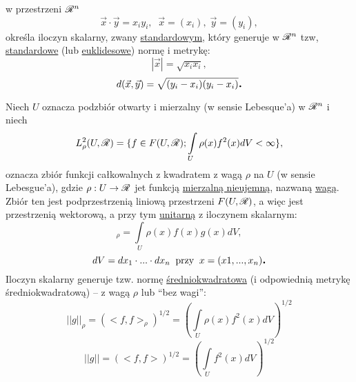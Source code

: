 \begin{example}
   w przestrzeni $\mathscr{R}^n$
   \[\vec{x} \cdot \vec{y} = x_i y_i, \;\; \vec{x} = (x_i), \; \vec{y} = (y_i),\]
   określa iloczyn skalarny, zwany \underline{standardowym}, który generuje w $\mathscr{R}^n$ tzw, \underline{standardowe} (lub \underline{euklidesowe}) normę i metrykę:
   \[|\vec{x}| = \sqrt{x_i x_i},\]
   \[d(\vec{x}, \vec{y}) = \sqrt{(y_i-x_i)(y_i-x_i)} \mbox{\large\bfseries .}\]
\end{example}

\begin{example}
   Niech $U$ oznacza podzbiór otwarty i mierzalny (w sensie Lebesque'a) w $\mathscr{R}^n$ i niech 
   \[L^2_\rho (U, \mathscr{R}) = \{f \in F(U, \mathscr{R}); \int \limits_{U} \rho(x) f^2(x) dV < \infty\},\]
   oznacza zbiór funkcji całkowalnych z kwadratem z wagą $\rho$ na $U$ (w sensie Lebesgue'a), gdzie $\rho: U \to \mathscr{R}$ jet funkcją \underline{mierzalną nieujemną}, nazwaną \underline{wagą}. Zbiór ten jest podprzestrzenią liniową przestrzeni $F(U, \mathscr{R})$, a więc jest przestrzenią wektorową, a przy tym \underline{unitarną} z iloczynem skalarnym:
   \[<f,g>_\rho = \int \limits_{U} \rho(x)f(x)g(x) dV,\]
   \[dV = dx_1\cdot ... \cdot dx_n \;\;\text{przy}\;\; x=(x1, ..., x_n) \mbox{\large\bfseries .}\]
   Iloczyn skalarny generuje tzw. normę \underline{średniokwadratowa} (i odpowiednią metrykę średniokwadratową) -- z wagą $\rho$ lub ``bez wagi'':
   \[||g||_\rho = (<f,f>_\rho)^{1/2} = \left(\int\limits_U \rho(x) f^2(x) dV \right)^{1/2}\]
   \[||g|| = (<f,f>)^{1/2} = \left(\int\limits_U  f^2(x) dV \right)^{1/2}\]
\end{example}


